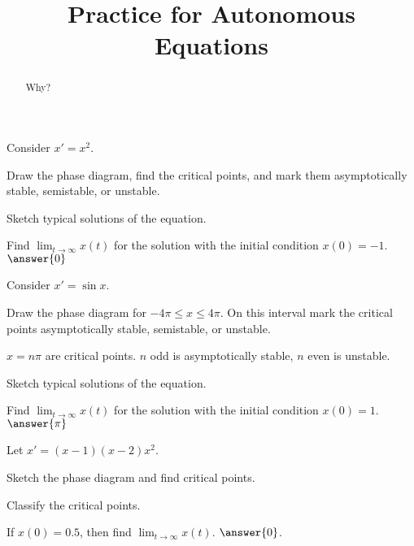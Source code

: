 \documentclass{ximera}
\title{Practice for Autonomous Equations}
\begin{document}
\begin{abstract}
    Why?
\end{abstract}
\maketitle


\begin{exercise}
    Consider $x' = x^2$.
    \begin{hint}
        Draw the phase diagram, find the critical points, and mark them asymptotically stable, semistable, or unstable.
    \end{hint}
    \begin{hint}
        Sketch typical solutions of the equation.
    \end{hint}
    
    Find $\displaystyle \lim_{t\to \infty} x(t)$ for the solution with the initial condition $x(0) = -1$. $\answer{0}$
    
\end{exercise}



\begin{exercise}
    Consider $x' = \sin x$.
    \begin{hint}
        Draw the phase diagram for $-4\pi \leq x \leq 4\pi$.  On this interval mark the critical points asymptotically stable, semistable, or unstable.
    \end{hint}
    \begin{hint}
        $x = n\pi$ are critical points. $n$ odd is asymptotically stable, $n$ even is unstable.
    \end{hint}
    \begin{hint}
        Sketch typical solutions of the equation.
    \end{hint}
    Find $\displaystyle \lim_{t\to \infty} x(t)$ for the solution with the initial condition $x(0) = 1$. $\answer{\pi}$
    
\end{exercise}


\begin{exercise}
    Let $x'=(x-1)(x-2)x^2$.
    \begin{hint}
        Sketch the phase diagram and find critical points.
    \end{hint}
    \begin{hint}
        Classify the critical points.
    \end{hint}
    If $x(0)=0.5$, then find $\displaystyle \lim_{t\to\infty} x(t)$. $\answer{0}$.
\end{exercise}
\end{document}
